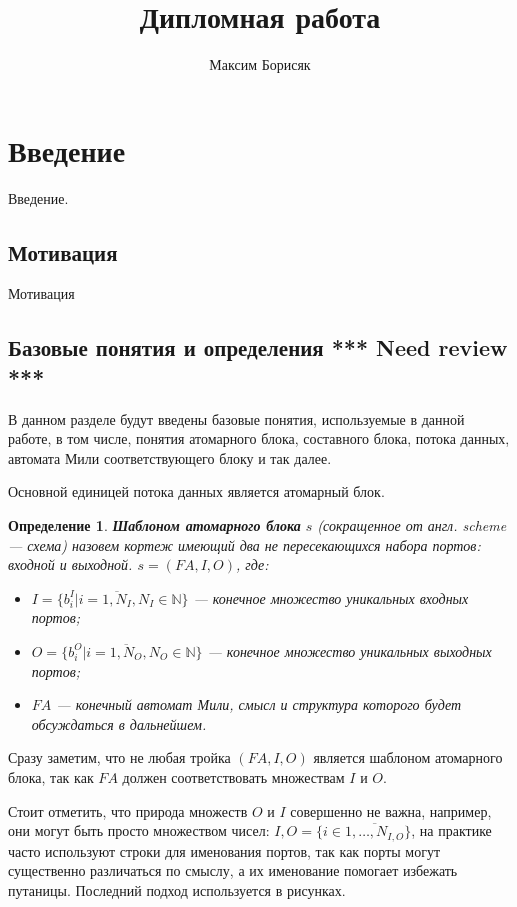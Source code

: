 \documentclass[10pt,a4paper]{article}
\author{Максим Борисяк}
\title{Дипломная работа}
\newtheorem{defen}{Определение}
\newcommand{\FA}{F\!A}
\begin{document}
\maketitle

\section{Введение}

Введение.

\subsection{Мотивация}
Мотивация

\subsection{Базовые понятия и определения \textbf{*** Need review ***}}
В данном разделе будут введены базовые понятия, используемые в данной работе, в том числе,
понятия атомарного блока, составного блока, потока данных, автомата Мили соответствующего блоку и так далее.

Основной единицей потока данных является атомарный блок.
\begin{defen}
  \textbf{Шаблоном атомарного блока} $s$ (сокращенное от англ. \textit{scheme} --- схема) назовем кортеж имеющий два не пересекающихся набора портов: \textit{входной} и \textit{выходной}.
  $s = (\FA, I, O)$, где:
  \begin{itemize}
    \item $I = \{b^I_i \vert i = \overline{1, N_I}, N_I \in \mathbb{N}\}$ --- конечное множество уникальных входных портов;
    \item $O = \{b^O_i \vert i = \overline{1, N_O}, N_O \in \mathbb{N}\}$ --- конечное множество уникальных выходных портов;
    \item $\FA$ --- конечный автомат Мили, смысл и структура которого будет обсуждаться в дальнейшем.
  \end{itemize}
\end{defen}
Сразу заметим, что не любая тройка $(\FA, I, O)$ является шаблоном атомарного блока, так как $\FA$ должен
соответствовать множествам $I$ и $O$.

Стоит отметить, что природа множеств $O$ и $I$ совершенно не важна, например, они могут быть просто множеством чисел: $I, O = \{i \in \overline{1, \dots, N_{I, O}}\}$,
на практике часто используют строки для именования портов, так как порты могут существенно различаться по смыслу, а их именование помогает избежать путаницы.
Последний подход используется в рисунках.
\end{document}
